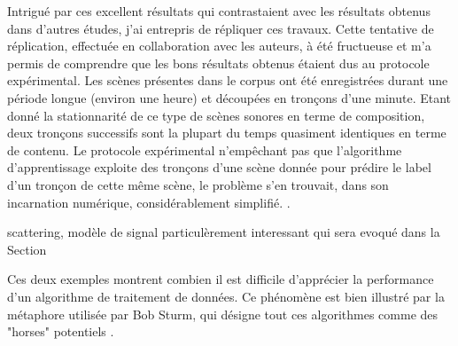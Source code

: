Intrigué par ces excellent résultats qui contrastaient avec les résultats obtenus dans d'autres études, j'ai entrepris de répliquer ces travaux. Cette tentative de réplication, effectuée en collaboration avec les auteurs, à été fructueuse et m'a permis de comprendre que les bons résultats obtenus étaient dus au protocole expérimental\cite{lagrange2015}. Les scènes présentes dans le corpus ont été enregistrées durant une période longue (environ une heure) et découpées en tronçons d'une minute. Etant donné la stationnarité de ce type de scènes sonores en terme de composition, deux tronçons successifs sont la plupart du temps quasiment identiques en terme de contenu. Le protocole expérimental n'empêchant pas que l'algorithme d'apprentissage exploite des tronçons d'une scène donnée pour prédire le label d'un tronçon de cette même scène, le problème s'en trouvait, dans son incarnation numérique, considérablement simplifié. .

scattering, modèle de signal particulèrement interessant qui sera evoqué dans la Section \Ref{}

Ces deux exemples montrent combien il est difficile d'apprécier la performance d'un algorithme de traitement de données. Ce phénomène est bien illustré par la métaphore utilisée par Bob Sturm, qui désigne tout ces algorithmes comme des "horses" potentiels .

